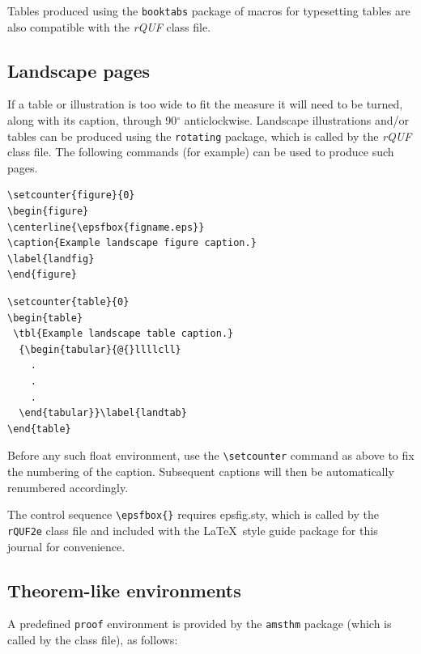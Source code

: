\documentclass{rQUF2e}
\theoremstyle{plain}
\theoremstyle{definition}
\theoremstyle{remark}
\begin{document}
Tables produced using the \texttt{booktabs} package of macros for typesetting tables are also compatible with the \textit{rQUF} class file.


\subsection{Landscape pages}\label{landscape}

If a table or illustration is too wide to fit the measure it will need to be turned, along with its caption, through
90$^{\circ}$ anticlockwise. Landscape illustrations and/or tables can be produced using the \verb"rotating" package, which is called by the \textit{rQUF} class file. The following commands (for example) can be used
to produce such pages.
\begin{verbatim}
\setcounter{figure}{0}
\begin{figure}
\centerline{\epsfbox{figname.eps}}
\caption{Example landscape figure caption.}
\label{landfig}
\end{figure}
\end{verbatim}

\begin{verbatim}
\setcounter{table}{0}
\begin{table}
 \tbl{Example landscape table caption.}
  {\begin{tabular}{@{}llllcll}
    .
    .
    .
  \end{tabular}}\label{landtab}
\end{table}
\end{verbatim}
Before any such float environment, use the \verb"\setcounter" command
as above to fix the numbering of the caption. Subsequent captions
will then be automatically renumbered accordingly.

The control sequence \verb"\epsfbox{}" requires epsfig.sty, which is called by the \texttt{rQUF2e} class file and included with the \LaTeX\ style guide package for this journal for convenience.


\subsection{Theorem-like environments}

A predefined \verb"proof" environment is provided by the \texttt{amsthm} package (which is called by the class file), as follows:
\end{document}
